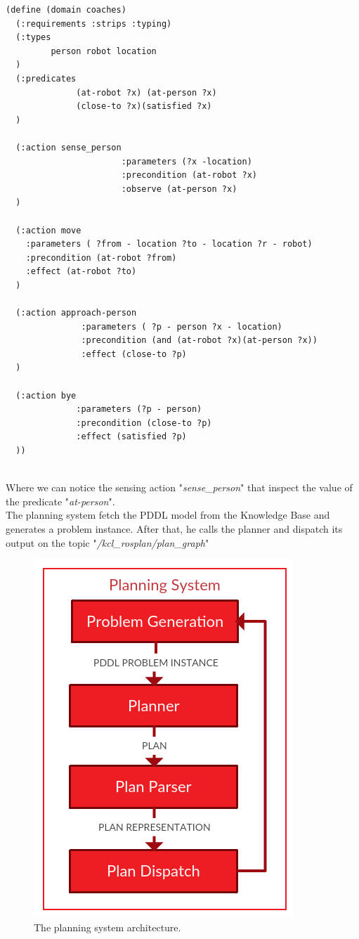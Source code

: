 \documentclass[pdftex,12pt,a4paper]{report}
\begin{document}
\begin{verbatim}
(define (domain coaches)
  (:requirements :strips :typing)
  (:types
         person robot location
  )
  (:predicates
              (at-robot ?x) (at-person ?x)
              (close-to ?x)(satisfied ?x)
  )
  
  (:action sense_person
                       :parameters (?x -location)
                       :precondition (at-robot ?x)
                       :observe (at-person ?x)
  )

  (:action move
    :parameters ( ?from - location ?to - location ?r - robot)
    :precondition (at-robot ?from)
    :effect (at-robot ?to)
  )

  (:action approach-person
               :parameters ( ?p - person ?x - location)
               :precondition (and (at-robot ?x)(at-person ?x))
               :effect (close-to ?p)
  )

  (:action bye
              :parameters (?p - person)
              :precondition (close-to ?p)
              :effect (satisfied ?p)
  ))
\end{verbatim}\\
Where we can notice the sensing action "\textit{sense\_person}" that inspect the value of the predicate "\textit{at-person}".\\
\noindent The planning system fetch the PDDL model from the Knowledge Base and generates a problem instance.
After that, he calls the planner and dispatch its output on the topic "\textit{/kcl\_rosplan/plan\_graph}"

\begin{figure}[H]
	\centering
	\includegraphics[scale=0.3]{images/dia_system.png}
	\caption{The planning system architecture.}
\end{figure}
\end{document}
